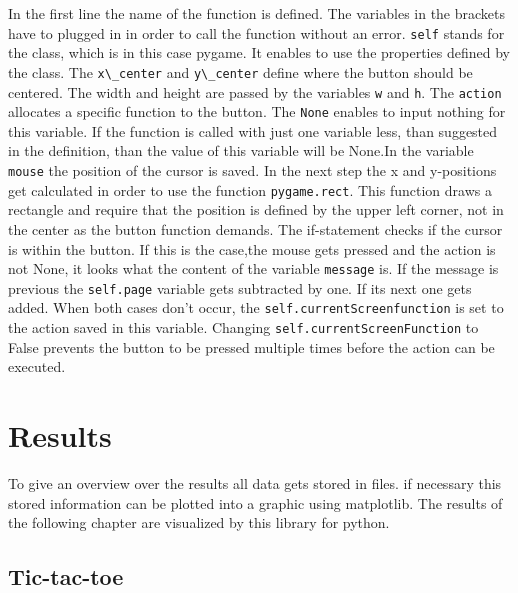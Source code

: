 \documentclass[12pt]{article}
\begin{document}
In the first line the name of the function is defined. The variables in the brackets have to plugged in in order to call the function without an error.  \lstinline{self} stands for the class, which is in this case pygame. It enables to use the properties defined by the class. The \lstinline{x\_center} and  \lstinline{y\_center} define where the button should be centered. The width and height are passed by the variables \lstinline{w} and  \lstinline{h}. The  \lstinline{action} allocates a specific function to the button. The \lstinline{None} enables to  \gls{input} nothing for this variable. If the function is called with just one variable less, than suggested in the definition, than the value of this variable will be None.In the variable \lstinline{mouse} the position of the cursor is saved. In the next step the x and y-positions get calculated in order to use the function \lstinline{pygame.rect}. This function draws a rectangle and require that the position is defined by the upper left corner, not in the center as the button function demands. The if-statement checks if the cursor is within the button. If this is the case,the mouse gets pressed and the action is not None, it looks what the content of the variable \lstinline{message} is. If the message is previous the \lstinline{self.page} variable gets subtracted by one. If its next one gets added. When both cases don't occur, the \lstinline{self.currentScreenfunction} is set to the action saved in this variable. Changing \lstinline{self.currentScreenFunction} to False prevents the button to be pressed multiple times before the action can be executed.

\section{Results}
To give an overview over the results all data gets stored in files. if necessary this stored information can be plotted into a graphic using \gls{matplotlib}. The results of the following chapter are visualized by this library for python.
\subsection{Tic-tac-toe}
\end{document}
